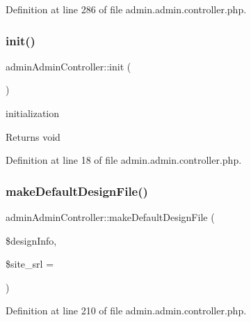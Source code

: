 Definition at line 286 of file admin.\+admin.\+controller.\+php.

\hypertarget{classadminAdminController_abfceebf69c8870ad40dcb1714a6aae0e}{}\label{classadminAdminController_abfceebf69c8870ad40dcb1714a6aae0e} 
\subsubsection{\texorpdfstring{init()}{init()}}
{\footnotesize\ttfamily admin\+Admin\+Controller\+::init (\begin{DoxyParamCaption}{ }\end{DoxyParamCaption})}

initialization \begin{DoxyReturn}{Returns}
void 
\end{DoxyReturn}


Definition at line 18 of file admin.\+admin.\+controller.\+php.

\hypertarget{classadminAdminController_a70c3ce620fc0791bb2acec0a9dedcc74}{}\label{classadminAdminController_a70c3ce620fc0791bb2acec0a9dedcc74} 
\subsubsection{\texorpdfstring{make\+Default\+Design\+File()}{makeDefaultDesignFile()}}
{\footnotesize\ttfamily admin\+Admin\+Controller\+::make\+Default\+Design\+File (\begin{DoxyParamCaption}\item[{}]{\$design\+Info,  }\item[{}]{\$site\+\_\+srl = {} }\end{DoxyParamCaption})}



Definition at line 210 of file admin.\+admin.\+controller.\+php.

\hypertarget{classadminAdminController_a603a7e8aca1d391d61599b8db4ef2ccb}{}\label{classadminAdminController_a603a7e8aca1d391d61599b8db4ef2ccb} 

